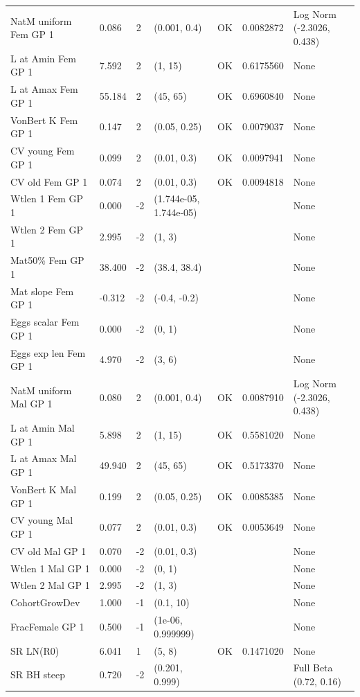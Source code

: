 \documentclass[11pt,
  english,
]{article}
\begin{document}
\begin{landscape}
\begin{longtable}[t]{lllllll}
\endfoot
\bottomrule
\endlastfoot
NatM uniform Fem GP 1 & 0.086 & 2 & (0.001, 0.4) & OK & 0.0082872 & Log Norm (-2.3026, 0.438)\\
L at Amin Fem GP 1 & 7.592 & 2 & (1, 15) & OK & 0.6175560 & None\\
L at Amax Fem GP 1 & 55.184 & 2 & (45, 65) & OK & 0.6960840 & None\\
VonBert K Fem GP 1 & 0.147 & 2 & (0.05, 0.25) & OK & 0.0079037 & None\\
CV young Fem GP 1 & 0.099 & 2 & (0.01, 0.3) & OK & 0.0097941 & None\\
\addlinespace
CV old Fem GP 1 & 0.074 & 2 & (0.01, 0.3) & OK & 0.0094818 & None\\
Wtlen 1 Fem GP 1 & 0.000 & -2 & (1.744e-05, 1.744e-05) &  &  & None\\
Wtlen 2 Fem GP 1 & 2.995 & -2 & (1, 3) &  &  & None\\
Mat50\% Fem GP 1 & 38.400 & -2 & (38.4, 38.4) &  &  & None\\
Mat slope Fem GP 1 & -0.312 & -2 & (-0.4, -0.2) &  &  & None\\
\addlinespace
Eggs scalar Fem GP 1 & 0.000 & -2 & (0, 1) &  &  & None\\
Eggs exp len Fem GP 1 & 4.970 & -2 & (3, 6) &  &  & None\\
NatM uniform Mal GP 1 & 0.080 & 2 & (0.001, 0.4) & OK & 0.0087910 & Log Norm (-2.3026, 0.438)\\
L at Amin Mal GP 1 & 5.898 & 2 & (1, 15) & OK & 0.5581020 & None\\
L at Amax Mal GP 1 & 49.940 & 2 & (45, 65) & OK & 0.5173370 & None\\
\addlinespace
VonBert K Mal GP 1 & 0.199 & 2 & (0.05, 0.25) & OK & 0.0085385 & None\\
CV young Mal GP 1 & 0.077 & 2 & (0.01, 0.3) & OK & 0.0053649 & None\\
CV old Mal GP 1 & 0.070 & -2 & (0.01, 0.3) &  &  & None\\
Wtlen 1 Mal GP 1 & 0.000 & -2 & (0, 1) &  &  & None\\
Wtlen 2 Mal GP 1 & 2.995 & -2 & (1, 3) &  &  & None\\
\addlinespace
CohortGrowDev & 1.000 & -1 & (0.1, 10) &  &  & None\\
FracFemale GP 1 & 0.500 & -1 & (1e-06, 0.999999) &  &  & None\\
SR LN(R0) & 6.041 & 1 & (5, 8) & OK & 0.1471020 & None\\
SR BH steep & 0.720 & -2 & (0.201, 0.999) &  &  & Full Beta (0.72, 0.16)\\

\end{longtable}
\end{landscape}
\end{document}
